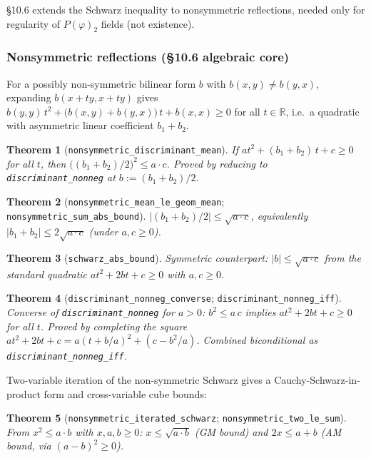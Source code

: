 \documentclass[a4paper,11pt]{article}
\newtheorem{theorem}{Theorem}
\begin{document}
\S10.6 extends the Schwarz inequality to nonsymmetric reflections,
needed only for regularity of $P(\varphi)_2$ fields (not existence).

\subsubsection{Nonsymmetric reflections (\S10.6 algebraic core)}

For a possibly non-symmetric bilinear form $b$ with
$b(x, y) \ne b(y, x)$, expanding $b(x + ty, x + ty)$ gives
$b(y, y)\,t^2 + \bigl(b(x, y) + b(y, x)\bigr)\,t + b(x, x) \ge 0$
for all $t \in \mathbb{R}$, i.e.\ a quadratic with asymmetric linear
coefficient $b_1 + b_2$.

\begin{theorem}[\texttt{nonsymmetric\_discriminant\_mean}]
If $a t^2 + (b_1 + b_2)\,t + c \ge 0$ for all $t$, then
$\bigl((b_1 + b_2) / 2\bigr)^2 \le a \cdot c$.
Proved by reducing to \texttt{discriminant\_nonneg} at
$b := (b_1 + b_2) / 2$.
\end{theorem}

\begin{theorem}[\texttt{nonsymmetric\_mean\_le\_geom\_mean};
\texttt{nonsymmetric\_sum\_abs\_bound}]
$|(b_1 + b_2) / 2| \le \sqrt{a \cdot c}$, equivalently
$|b_1 + b_2| \le 2\sqrt{a \cdot c}$ (under $a, c \ge 0$).
\end{theorem}

\begin{theorem}[\texttt{schwarz\_abs\_bound}]
Symmetric counterpart: $|b| \le \sqrt{a \cdot c}$ from the standard
quadratic $a t^2 + 2bt + c \ge 0$ with $a, c \ge 0$.
\end{theorem}

\begin{theorem}[\texttt{discriminant\_nonneg\_converse};
\texttt{discriminant\_nonneg\_iff}]
Converse of \texttt{discriminant\_nonneg} for $a > 0$:
$b^2 \le a\,c$ implies $a t^2 + 2bt + c \ge 0$ for all $t$.
Proved by completing the square
$a t^2 + 2bt + c = a(t + b/a)^2 + (c - b^2/a)$.
Combined biconditional as \texttt{discriminant\_nonneg\_iff}.
\end{theorem}

Two-variable iteration of the non-symmetric Schwarz gives a
Cauchy-Schwarz-in-product form and cross-variable cube bounds:

\begin{theorem}[\texttt{nonsymmetric\_iterated\_schwarz};
\texttt{nonsymmetric\_two\_le\_sum}]
From $x^2 \le a \cdot b$ with $x, a, b \ge 0$:
$x \le \sqrt{a \cdot b}$ (GM bound) and $2x \le a + b$ (AM bound,
via $(a - b)^2 \ge 0$).
\end{theorem}
\end{document}
